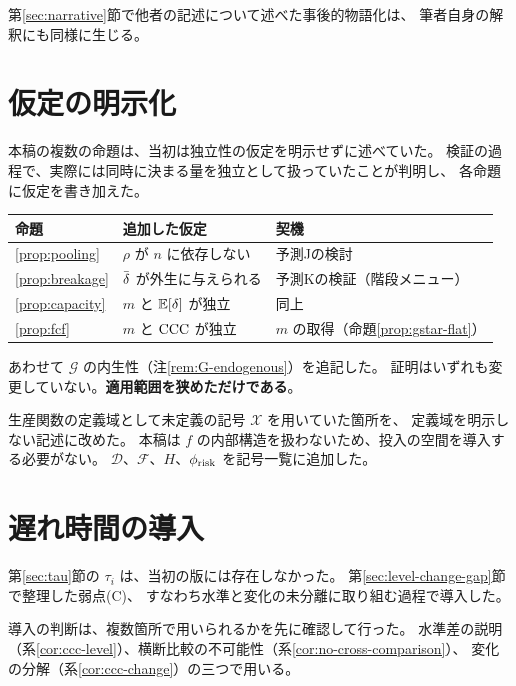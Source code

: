 第\ref{sec:narrative}節で他者の記述について述べた事後的物語化は、
筆者自身の解釈にも同様に生じる。

\section{仮定の明示化}

本稿の複数の命題は、当初は独立性の仮定を明示せずに述べていた。
検証の過程で、実際には同時に決まる量を独立として扱っていたことが判明し、
各命題に仮定を書き加えた。

\begin{center}
\begin{tabularx}{\textwidth}{@{}lXl@{}}
\toprule
命題 & 追加した仮定 & 契機 \\
\midrule
\ref{prop:pooling} & $\rho$ が $n$ に依存しない & 予測Jの検討 \\
\ref{prop:breakage} & $\dbar$ が外生に与えられる & 予測Kの検証（階段メニュー） \\
\ref{prop:capacity} & $m$ と $\mathbb{E}[\delta]$ が独立 & 同上 \\
\ref{prop:fcf} & $m$ と $\mathrm{CCC}$ が独立 & $m$ の取得（命題\ref{prop:gstar-flat}） \\
\bottomrule
\end{tabularx}
\label{tab:assumption-additions}
\end{center}

あわせて $\mathcal{G}$ の内生性（注\ref{rem:G-endogenous}）を追記した。
証明はいずれも変更していない。\textbf{適用範囲を狭めただけである}。

生産関数の定義域として未定義の記号 $\mathcal{X}$ を用いていた箇所を、
定義域を明示しない記述に改めた。
本稿は $f$ の内部構造を扱わないため、投入の空間を導入する必要がない。
$\mathcal{D}$、$\mathcal{F}$、$H$、$\phi_{\rm risk}$ を記号一覧に追加した。

\section{遅れ時間の導入}

第\ref{sec:tau}節の $\tau_i$ は、当初の版には存在しなかった。
第\ref{sec:level-change-gap}節で整理した弱点(C)、
すなわち水準と変化の未分離に取り組む過程で導入した。

導入の判断は、複数箇所で用いられるかを先に確認して行った。
水準差の説明（系\ref{cor:ccc-level}）、横断比較の不可能性（系\ref{cor:no-cross-comparison}）、
変化の分解（系\ref{cor:ccc-change}）の三つで用いる。

